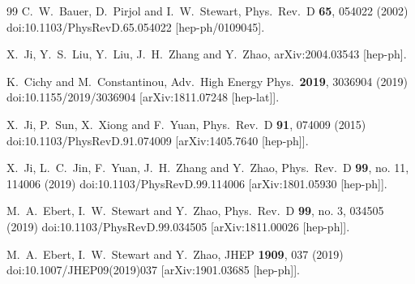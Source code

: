 \begin{thebibliography}{99}
  C.~W.~Bauer, D.~Pirjol and I.~W.~Stewart,
  Phys.\ Rev.\ D {\bf 65}, 054022 (2002)
  doi:10.1103/PhysRevD.65.054022
  [hep-ph/0109045].


  X.~Ji, Y.~S.~Liu, Y.~Liu, J.~H.~Zhang and Y.~Zhao,
  arXiv:2004.03543 [hep-ph].


  K.~Cichy and M.~Constantinou,
  Adv.\ High Energy Phys.\  {\bf 2019}, 3036904 (2019)
  doi:10.1155/2019/3036904
  [arXiv:1811.07248 [hep-lat]].


  X.~Ji, P.~Sun, X.~Xiong and F.~Yuan,
  Phys.\ Rev.\ D {\bf 91}, 074009 (2015)
  doi:10.1103/PhysRevD.91.074009
  [arXiv:1405.7640 [hep-ph]].


  X.~Ji, L.~C.~Jin, F.~Yuan, J.~H.~Zhang and Y.~Zhao,
  Phys.\ Rev.\ D {\bf 99}, no. 11, 114006 (2019)
  doi:10.1103/PhysRevD.99.114006
  [arXiv:1801.05930 [hep-ph]].


  M.~A.~Ebert, I.~W.~Stewart and Y.~Zhao,
  Phys.\ Rev.\ D {\bf 99}, no. 3, 034505 (2019)
  doi:10.1103/PhysRevD.99.034505
  [arXiv:1811.00026 [hep-ph]].


  M.~A.~Ebert, I.~W.~Stewart and Y.~Zhao,
  JHEP {\bf 1909}, 037 (2019)
  doi:10.1007/JHEP09(2019)037
  [arXiv:1901.03685 [hep-ph]].



\end{thebibliography}
